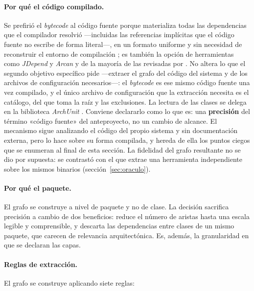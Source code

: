 \paragraph{Por qué el código compilado.} Se prefirió el \textit{bytecode} al código fuente porque materializa todas las dependencias que el compilador resolvió ---incluidas las referencias implícitas que el código fuente no escribe de forma literal---, en un formato uniforme y sin necesidad de reconstruir el entorno de compilación \citep{ArchUnit}; es también la opción de herramientas como \textit{JDepend} y \textit{Arcan} \citep{JDepend, ArcelliFontana2016} y de la mayoría de las revisadas por \citet{KnodelPopescu2007}. No altera lo que el segundo objetivo específico pide ---extraer el grafo del código del sistema y de los archivos de configuración necesarios---: el \textit{bytecode} es ese mismo código fuente una vez compilado, y el único archivo de configuración que la extracción necesita es el catálogo, del que toma la raíz y las exclusiones. La lectura de las clases se delega en la biblioteca \textit{ArchUnit} \citep{ArchUnit}. Conviene declararlo como lo que es: una \textbf{precisión} del término «código fuente» del anteproyecto, no un cambio de alcance. El mecanismo sigue analizando el código del propio sistema y sin documentación externa, pero lo hace sobre su forma compilada, y hereda de ella los puntos ciegos que se enumeran al final de esta sección. La fidelidad del grafo resultante no se dio por supuesta: se contrastó con el que extrae una herramienta independiente sobre los mismos binarios (sección~\ref{sec:oraculo}).

\paragraph{Por qué el paquete.} El grafo se construye a nivel de paquete y no de clase. La decisión sacrifica precisión a cambio de dos beneficios: reduce el número de aristas hasta una escala legible y comprensible, y descarta las dependencias entre clases de un mismo paquete, que carecen de relevancia arquitectónica. Es, además, la granularidad en que se declaran las capas.

\paragraph{Reglas de extracción.} El grafo se construye aplicando siete reglas:

